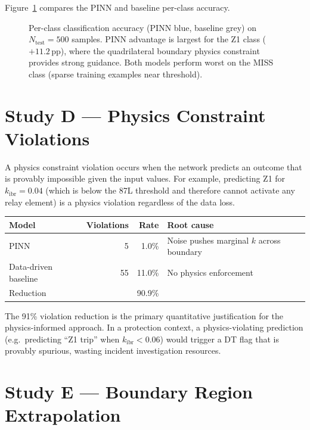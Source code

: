 \documentclass[11pt,a4paper]{article}
\begin{document}
Figure~\ref{fig:accuracy} compares the PINN and baseline per-class accuracy.

\begin{figure}[htbp]
  \centering
  \resizebox{0.88\textwidth}{!}{}
  \caption{Per-class classification accuracy (PINN blue, baseline grey) on
           $N_\mathrm{test}=500$ samples.  PINN advantage is largest for the
           Z1 class ($+11.2$\,pp), where the quadrilateral boundary physics
           constraint provides strong guidance.  Both models perform worst on
           the MISS class (sparse training examples near threshold).}
  \label{fig:accuracy}
\end{figure}

\section{Study D --- Physics Constraint Violations}
\label{sec:studyD}

A physics constraint violation occurs when the network predicts an outcome
that is provably impossible given the input values.  For example, predicting
Z1 for $k_\mathrm{ibr}=0.04$ (which is below the 87L threshold and therefore
cannot activate any relay element) is a physics violation regardless of the
data loss.

\begin{center}
\begin{tabular}{@{}lrrl@{}}
\toprule
Model & Violations & Rate & Root cause \\
\midrule
PINN & 5 & 1.0\% & Noise pushes marginal $k$ across boundary \\
Data-driven baseline & 55 & 11.0\% & No physics enforcement \\
\midrule
Reduction & & 90.9\% & \\
\bottomrule
\end{tabular}
\end{center}

\medskip\noindent
The 91\% violation reduction is the primary quantitative justification for the
physics-informed approach.  In a protection context, a physics-violating
prediction (e.g.\ predicting ``Z1 trip'' when $k_\mathrm{ibr}<0.06$) would
trigger a DT flag that is provably spurious, wasting incident investigation
resources.

\section{Study E --- Boundary Region Extrapolation}
\label{sec:studyE}
\end{document}
